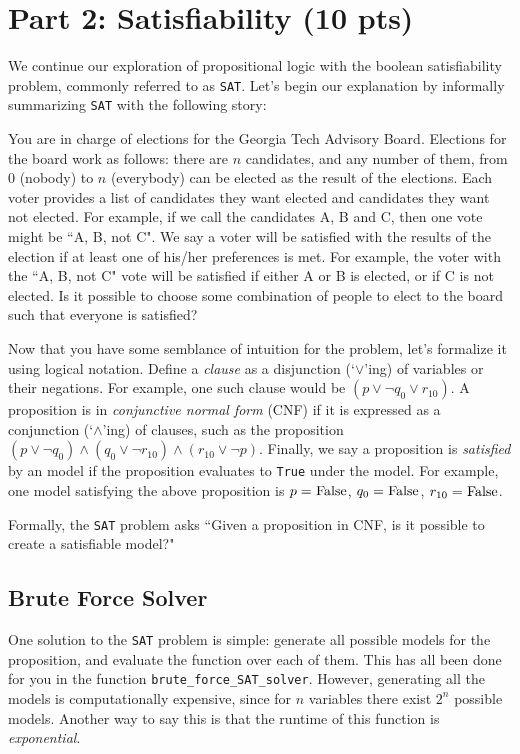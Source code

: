 \documentclass{article}
\begin{document}
\section*{Part 2: Satisfiability (10 pts)}
    We continue our exploration of propositional logic with the boolean satisfiability problem, commonly referred to as \verb+SAT+. Let's begin our explanation by informally summarizing \verb+SAT+ with the following story:
    \begin{tcolorbox}[colback=red!10]
        You are in charge of elections for the Georgia Tech Advisory Board. Elections for the board work as follows: there are $n$ candidates, and any number of them, from 0 (nobody) to $n$ (everybody) can be elected as the result of the elections. Each voter provides a list of candidates they want elected and candidates they want not elected. For example, if we call the candidates A, B and C, then one vote might be ``A, B, not C". We say a voter will be satisfied with the results of the election if at least one of his/her preferences is met. For example, the voter with the ``A, B, not C" vote will be satisfied if either A or B is elected, or if C is not elected. Is it possible to choose some combination of people to elect to the board such that everyone is satisfied? 
    \end{tcolorbox}
    Now that you have some semblance of intuition for the problem, let's formalize it using logical notation. Define a \textit{clause} as a disjunction (`$\lor$'ing) of variables or their negations. For example, one such clause would be $(p \lor \neg q_{0} \lor r_{10})$. A proposition is in \textit{conjunctive normal form} (CNF) if it is expressed as a conjunction (`$\land$'ing) of clauses, such as the proposition $(p \lor \neg q_{0}) \land (q_{0} \lor \neg r_{10}) \land (r_{10} \lor \neg p)$. Finally, we say a proposition is \textit{satisfied} by an model if the proposition evaluates to \lstinline{True} under the model. For example, one model satisfying the above proposition is $p = \text{\lstinline{False}}$, $q_{0} = \text{\lstinline{False}}$, $r_{10} = \text{\lstinline{False}}$.

    \vspace{2mm}
    Formally, the \lstinline{SAT} problem asks ``Given a proposition in CNF, is it possible to create a satisfiable model?"

\subsection*{Brute Force Solver}
        One solution to the \lstinline{SAT} problem is simple: generate all possible models for the proposition, and evaluate the function over each of them. This has all been done for you in the function \lstinline{brute_force_SAT_solver}. However, generating all the models is computationally expensive, since for $n$ variables there exist $2^{n}$ possible models. Another way to say this is that the runtime of this function is \textit{exponential}.
\end{document}

